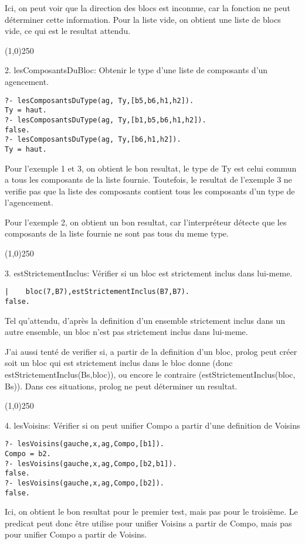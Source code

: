 \documentclass[letterpaper,11pt]{letter}
\begin{document}
Ici, on peut voir que la direction des blocs est inconnue, car la fonction ne peut déterminer cette
information. Pour la liste vide, on obtient une liste de blocs vide, ce qui est le resultat attendu.

\begin{center}
\line(1,0){250}
\end{center}

2. lesComposantsDuBloc: Obtenir le type d'une liste de composants d'un agencement.
\begin{verbatim}
?- lesComposantsDuType(ag, Ty,[b5,b6,h1,h2]).
Ty = haut.
?- lesComposantsDuType(ag, Ty,[b1,b5,b6,h1,h2]).
false.
?- lesComposantsDuType(ag, Ty,[b6,h1,h2]).
Ty = haut.
\end{verbatim}

Pour l'exemple 1 et 3, on obtient le bon resultat, le type de Ty est celui commun a tous les composants
de la liste fournie. Toutefois, le resultat de l'exemple 3 ne verifie pas que la liste des composants contient
tous les composants d'un type de l'agencement.

Pour l'exemple 2, on obtient un bon resultat, car l'interpréteur détecte que les composants de la liste fournie
ne sont pas tous du meme type.

\begin{center}
\line(1,0){250}
\end{center}

3. estStrictementInclus: Vérifier si un bloc est strictement inclus dans lui-meme.
\begin{verbatim}
|    bloc(7,B7),estStrictementInclus(B7,B7).
false.
\end{verbatim}

Tel qu'attendu, d'après la definition d'un ensemble strictement inclus dans un autre ensemble,
un bloc n'est pas strictement inclus dans lui-meme.

J'ai aussi tenté de verifier si, a partir de la definition d'un bloc, prolog peut créer soit un
bloc qui est strictement inclus dans le bloc donne (donc estStrictementInclus(Bs,bloc)), ou 
encore le contraire (estStrictementInclus(bloc, Bs)). Dans ces situations, prolog ne peut
déterminer un resultat.

\begin{center}
\line(1,0){250}
\end{center}

4. lesVoisins: Vérifier si on peut unifier Compo a partir d'une definition de Voisins
\begin{verbatim}
?- lesVoisins(gauche,x,ag,Compo,[b1]).
Compo = b2.
?- lesVoisins(gauche,x,ag,Compo,[b2,b1]).
false.
?- lesVoisins(gauche,x,ag,Compo,[b2]).
false.
\end{verbatim}

Ici, on obtient le bon resultat pour le premier test, mais pas pour le troisième. Le predicat peut
donc être utilise pour unifier Voisins a partir de Compo, mais pas pour unifier Compo a partir de Voisins.
\end{document}
